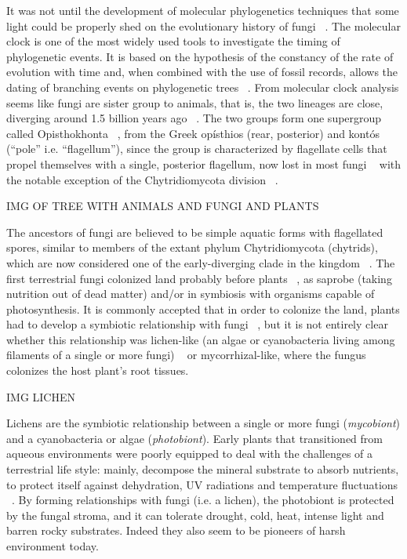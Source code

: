 It was not until the development of molecular phylogenetics techniques that some light could be properly shed on the evolutionary history of fungi ~\citep{james2006}.
The molecular clock is one of the most widely used tools to investigate the timing of phylogenetic events. It is based on the hypothesis of the constancy of the rate of evolution with time and, when combined with the use of fossil records, allows the dating of branching events on phylogenetic trees ~\citep{lepage2007, weir2008}.
From molecular clock analysis seems like fungi are sister group to animals, that is, the two lineages are close, diverging around 1.5 billion years ago ~\citep{wang1999}. The two groups form one supergroup called Opisthokhonta ~\citep{cavalier-smith1987}, from the Greek opísthios (rear, posterior) and kontós (``pole'' i.e. ``flagellum''), since the group is characterized by flagellate cells that propel themselves with a single, posterior flagellum, now lost in most fungi ~\citep{steenkamp2006} with the notable exception of the Chytridiomycota division ~\citep{james2006a}.

IMG OF TREE WITH ANIMALS AND FUNGI AND PLANTS

The ancestors of fungi are believed to be simple aquatic forms with flagellated spores, similar to members of the extant phylum Chytridiomycota (chytrids), which are now considered one of the early-diverging clade in the kingdom ~\citep{james2006}. The first terrestrial fungi colonized land probably before plants ~\citep{heckman2001}, as saprobe (taking nutrition out of dead matter) and\slash or in symbiosis with organisms capable of photosynthesis.
It is commonly accepted that in order to colonize the land, plants had to develop a symbiotic relationship with fungi ~\citep{selosse1998, heckman2001, bonneville2020}, but it is not entirely clear whether this relationship was lichen-like (an algae or cyanobacteria living among filaments of a single or more fungi) ~\citep{spribille2016} or mycorrhizal-like, where the fungus colonizes the host plant's root tissues.

IMG LICHEN

Lichens are the symbiotic relationship between a single or more fungi (\emph{mycobiont}) and a cyanobacteria or algae (\emph{photobiont}). Early plants that transitioned from aqueous environments were poorly equipped to deal with the challenges of a terrestrial life style: mainly, decompose the mineral substrate to absorb nutrients, to protect itself against dehydration, UV radiations and temperature fluctuations ~\citep{selosse1998, blackwell2000}. By forming relationships with fungi (i.e. a lichen), the photobiont is protected by the fungal stroma, and it can tolerate drought, cold, heat, intense light and barren rocky substrates. Indeed they also seem to be pioneers of harsh environment today.

